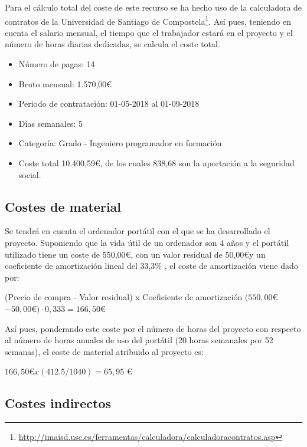 Para el cálculo total del coste de este recurso se ha hecho uso de la calculadora de contratos de la Universidad de Santiago de Compostela\footnote{\url{http://imaisd.usc.es/ferramentas/calculadora/calculadoracontratos.asp}}. Así pues, teniendo en cuenta el salario mensual, el tiempo que el trabajador estará en el proyecto y el número de horas diarias dedicadas, se calcula el coste total. 
    \begin{itemize}
        \item Número de pagas: 14
        \item Bruto mensual: 1.570,00\euro
        \item Periodo de contratación: 01-05-2018 al 01-09-2018
        \item Días semanales: 5
        \item Categoría: Grado - Ingeniero programador en formación
        \item Coste total 10.400,59\euro, de los cuales 838,68 son la aportación a la seguridad social.
    \end{itemize}

\subsection{Costes de material}

Se tendrá en cuenta el ordenador portátil con el que se ha desarrollado el proyecto. Suponiendo que la vida útil de un ordenador son 4 años y el portátil utilizado tiene un coste de 550,00\euro, con un valor residual de 50,00\euro y un coeficiente de amortización lineal del 33,3\% , el coste de amortización viene dado por:
   \begin{center}
        (Precio de  compra - Valor residual) x Coeficiente de amortización
        $(550,00$\euro$ - 50,00$\euro$) \cdot 0,333 = 166,50$\euro   
    \end{center}
    Así pues, ponderando este coste por el número de horas del proyecto con respecto al número de horas anuales de uso del portátil (20 horas semanales por 52 semanas), el coste de material atribuido al proyecto es:
    \begin{center}
        $166,50$\euro$ x (412.5 / 1040) = 65,95$ \euro 
    \end{center}
    
\subsection{Costes indirectos}

